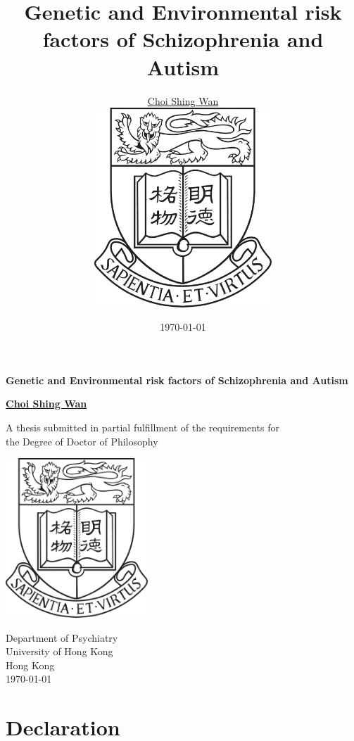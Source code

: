 \documentclass{book}
\title{Genetic and Environmental risk factors of Schizophrenia and Autism}
\date{\today}
\author{\href{mailto:choishingwan@gmail.com}{Choi Shing Wan}\\
	\includegraphics[width=0.5\textwidth]{hkuLogo.jpg}}
\begin{document}
\thispagestyle{empty}
\pagestyle{empty}

\begin{titlepage}
	\begin{center}
		\vspace*{1cm}
		
		\Huge
		\textbf{Genetic and Environmental risk factors of Schizophrenia and Autism}
		
		\vspace{0.5cm}
		\LARGE
		
		\vspace{1.5cm}
		
		\textbf{\href{mailto:choishingwan@gmail.com}{Choi Shing Wan}}
		
		\vfill
		
		A thesis submitted in partial fulfillment of the requirements for \\
		the Degree of Doctor of Philosophy
		
		\vspace{0.8cm}
		
		\includegraphics[width=0.4\textwidth]{hkuLogo.jpg}
		
		\Large
		Department of Psychiatry\\
		University of Hong Kong\\
		Hong Kong\\
		\today
		
	\end{center}
\end{titlepage}


\frontmatter 

	\cleardoublepage
	\chapter*{Declaration}
	
\end{document}
